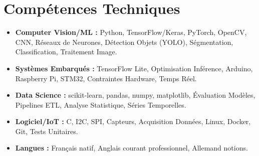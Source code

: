 \documentclass[a4paper,11pt]{article}
\begin{document}
\section{Comp\'etences Techniques}
\begin{itemize}[leftmargin=*, nosep]
    \item \small{\textbf{Computer Vision/ML :} Python, TensorFlow/Keras, PyTorch, OpenCV, CNN, R\'eseaux de Neurones, D\'etection Objets (YOLO), S\'egmentation, Classification, Traitement Image.}
    \item \small{\textbf{Syst\`emes Embarqu\'es :} TensorFlow Lite, Optimisation Inf\'erence, Arduino, Raspberry Pi, STM32, Contraintes Hardware, Temps R\'eel.}
    \item \small{\textbf{Data Science :} scikit-learn, pandas, numpy, matplotlib, \'Evaluation Mod\`eles, Pipelines ETL, Analyse Statistique, S\'eries Temporelles.}
    \item \small{\textbf{Logiciel/IoT :} C, I2C, SPI, Capteurs, Acquisition Donn\'ees, Linux, Docker, Git, Tests Unitaires.}
    \item \small{\textbf{Langues :} Fran\c{c}ais natif, Anglais courant professionnel, Allemand notions.}
\end{itemize}
\end{document}
